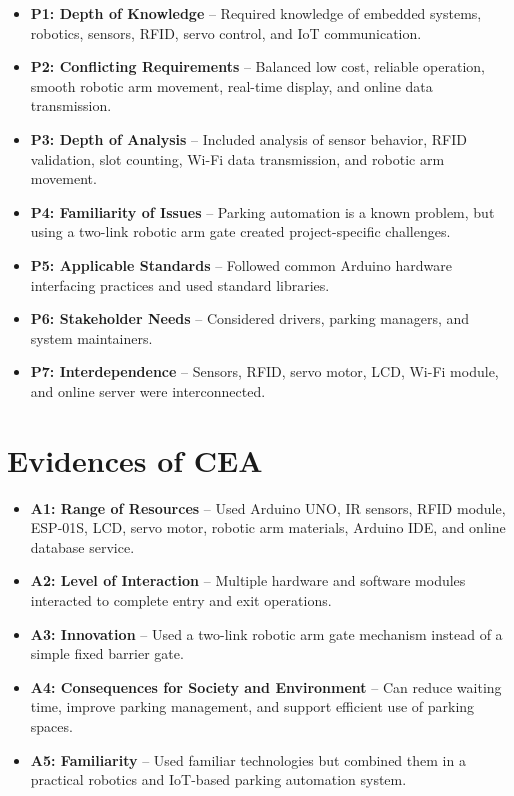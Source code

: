 \begin{itemize}
    \item \textbf{P1: Depth of Knowledge} -- Required knowledge of embedded systems, robotics, sensors, RFID, servo control, and IoT communication.
    \item \textbf{P2: Conflicting Requirements} -- Balanced low cost, reliable operation, smooth robotic arm movement, real-time display, and online data transmission.
    \item \textbf{P3: Depth of Analysis} -- Included analysis of sensor behavior, RFID validation, slot counting, Wi-Fi data transmission, and robotic arm movement.
    \item \textbf{P4: Familiarity of Issues} -- Parking automation is a known problem, but using a two-link robotic arm gate created project-specific challenges.
    \item \textbf{P5: Applicable Standards} -- Followed common Arduino hardware interfacing practices and used standard libraries.
    \item \textbf{P6: Stakeholder Needs} -- Considered drivers, parking managers, and system maintainers.
    \item \textbf{P7: Interdependence} -- Sensors, RFID, servo motor, LCD, Wi-Fi module, and online server were interconnected.
\end{itemize}

\section{Evidences of CEA}

\begin{itemize}
    \item \textbf{A1: Range of Resources} -- Used Arduino UNO, IR sensors, RFID module, ESP-01S, LCD, servo motor, robotic arm materials, Arduino IDE, and online database service.
    \item \textbf{A2: Level of Interaction} -- Multiple hardware and software modules interacted to complete entry and exit operations.
    \item \textbf{A3: Innovation} -- Used a two-link robotic arm gate mechanism instead of a simple fixed barrier gate.
    \item \textbf{A4: Consequences for Society and Environment} -- Can reduce waiting time, improve parking management, and support efficient use of parking spaces.
    \item \textbf{A5: Familiarity} -- Used familiar technologies but combined them in a practical robotics and IoT-based parking automation system.
\end{itemize}

